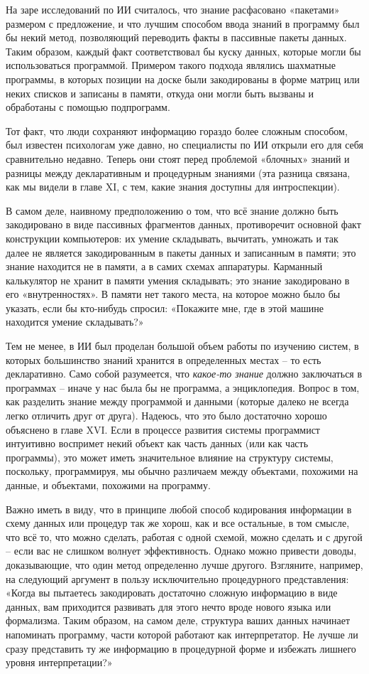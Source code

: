 \documentclass[../main.tex]{subfiles}
\begin{document}
На заре исследований по ИИ считалось, что знание расфасовано «пакетами» размером с предложение, и что лучшим способом ввода знаний в программу был бы некий метод, позволяющий переводить факты в пассивные пакеты данных. Таким образом, каждый факт соответствовал бы куску данных, которые могли бы использоваться программой. Примером такого подхода являлись шахматные программы, в которых позиции на доске были закодированы в форме матриц или неких списков и записаны в памяти, откуда они могли быть вызваны и обработаны с помощью подпрограмм.

Тот факт, что люди сохраняют информацию гораздо более сложным способом, был известен психологам уже давно, но специалисты по ИИ открыли его для себя сравнительно недавно. Теперь они стоят перед проблемой «блочных» знаний и разницы между декларативным и процедурным знаниями (эта разница связана, как мы видели в главе XI, с тем, какие знания доступны для интроспекции).

В самом деле, наивному предположению о том, что всё знание должно быть закодировано в виде пассивных фрагментов данных, противоречит основной факт конструкции компьютеров: их умение складывать, вычитать, умножать и так далее не является закодированным в пакеты данных и записанным в памяти; это знание находится не в памяти, а в самих схемах аппаратуры. Карманный калькулятор не хранит в памяти умения складывать; это знание закодировано в его «внутренностях». В памяти нет такого места, на которое можно было бы указать, если бы кто-нибудь спросил: «Покажите мне, где в этой машине находится умение складывать?»

Тем не менее, в ИИ был проделан большой объем работы по изучению систем, в которых большинство знаний хранится в определенных местах \--- то есть декларативно. Само собой разумеется, что \emph{какое-то знание} должно заключаться в программах \--- иначе у нас была бы не программа, а энциклопедия. Вопрос в том, как разделить знание между программой и данными (которые далеко не всегда легко отличить друг от друга). Надеюсь, что это было достаточно хорошо объяснено в главе XVI. Если в процессе развития системы программист интуитивно воспримет некий объект как часть данных (или как часть программы), это может иметь значительное влияние на структуру системы, поскольку, программируя, мы обычно различаем между объектами, похожими на данные, и объектами, похожими на программу.

Важно иметь в виду, что в принципе любой способ кодирования информации в схему данных или процедур так же хорош, как и все остальные, в том смысле, что всё то, что можно сделать, работая с одной схемой, можно сделать и с другой \--- если вас не слишком волнует эффективность. Однако можно привести доводы, доказывающие, что один метод определенно лучше другого. Взгляните, например, на следующий аргумент в пользу исключительно процедурного представления: «Когда вы пытаетесь закодировать достаточно сложную информацию в виде данных, вам приходится развивать для этого нечто вроде нового языка или формализма. Таким образом, на самом деле, структура ваших данных начинает напоминать программу, части которой работают как интерпретатор. Не лучше ли сразу представить ту же информацию в процедурной форме и избежать лишнего уровня интерпретации?»
\end{document}
